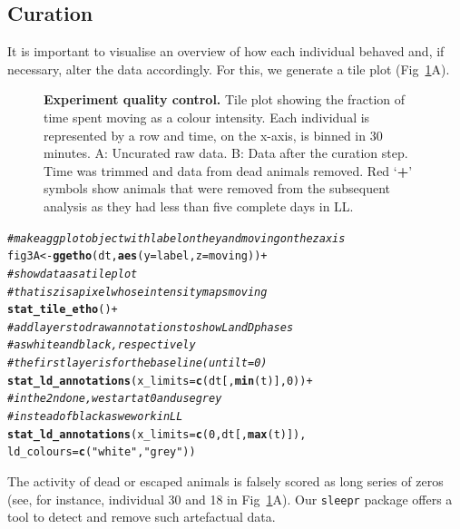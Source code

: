 \documentclass[10pt,letterpaper]{article}\usepackage[]{graphicx}\usepackage[]{color}
\makeatletter
\newcommand{\hlnum}[1]{\textcolor[rgb]{0.686,0.059,0.569}{#1}}%
\newcommand{\hlstr}[1]{\textcolor[rgb]{0.192,0.494,0.8}{#1}}%
\newcommand{\hlcom}[1]{\textcolor[rgb]{0.678,0.584,0.686}{\textit{#1}}}%
\newcommand{\hlopt}[1]{\textcolor[rgb]{0,0,0}{#1}}%
\newcommand{\hlstd}[1]{\textcolor[rgb]{0.345,0.345,0.345}{#1}}%
\newcommand{\hlkwb}[1]{\textcolor[rgb]{0.69,0.353,0.396}{#1}}%
\newcommand{\hlkwc}[1]{\textcolor[rgb]{0.333,0.667,0.333}{#1}}%
\newcommand{\hlkwd}[1]{\textcolor[rgb]{0.737,0.353,0.396}{\textbf{#1}}}%
\newenvironment{kframe}{%
 \def\at@end@of@kframe{}%
 \ifinner\ifhmode%
  \def\at@end@of@kframe{\end{minipage}}%
  \begin{minipage}{\columnwidth}%
 \fi\fi%
 \def\FrameCommand##1{\hskip\@totalleftmargin \hskip-\fboxsep
 \colorbox{shadecolor}{##1}\hskip-\fboxsep
     \hskip-\linewidth \hskip-\@totalleftmargin \hskip\columnwidth}%
 \MakeFramed {\advance\hsize-\width
   \@totalleftmargin\z@ \linewidth\hsize
   \@setminipage}}%
 {\par\unskip\endMakeFramed%
 \at@end@of@kframe}
\newenvironment{knitrout}{}{} %
\makeatother
\begin{document}
\subsection*{Curation}
It is important to visualise an overview of how each individual behaved and, if necessary, alter the data accordingly. For this, we generate a tile plot (Fig~\ref{fig:fig-3}A).

\begin{figure}[!h]
	\caption{{\bf Experiment quality control.}
			Tile plot showing the fraction of time spent moving as a colour intensity.
			Each individual is represented by a row and time, on the x-axis, is binned in 30 minutes.
			A: Uncurated raw data.
			B: Data after the curation step. Time was trimmed and data from dead animals removed. 
			Red `\textbf{+}' symbols show animals that were removed from the subsequent analysis as they had less than five complete days in LL.}
	\label{fig:fig-3}
\end{figure}

\begin{knitrout}
\color{fgcolor}\begin{kframe}
\begin{alltt}
\hlcom{# make a ggplot object with label on the y and moving on the z axis}
\hlstd{fig3A} \hlkwb{<-} \hlkwd{ggetho}\hlstd{(dt,} \hlkwd{aes}\hlstd{(}\hlkwc{y} \hlstd{= label,} \hlkwc{z} \hlstd{= moving))} \hlopt{+}
  \hlcom{# show data as a tile plot}
  \hlcom{# that is z is a pixel whose intensity maps moving}
  \hlkwd{stat_tile_etho}\hlstd{()} \hlopt{+}
  \hlcom{# add layers to draw annotations to show L and D phases}
  \hlcom{# as white and black, respectively}
  \hlcom{# the first layer is for the baseline (until t = 0)}
  \hlkwd{stat_ld_annotations}\hlstd{(}\hlkwc{x_limits} \hlstd{=} \hlkwd{c}\hlstd{(dt[,}\hlkwd{min}\hlstd{(t)],} \hlnum{0}\hlstd{))} \hlopt{+}
  \hlcom{# in the 2nd one, we start at 0 and use grey }
  \hlcom{# instead of black as we work in LL}
  \hlkwd{stat_ld_annotations}\hlstd{(}\hlkwc{x_limits} \hlstd{=} \hlkwd{c}\hlstd{(}\hlnum{0}\hlstd{, dt[,} \hlkwd{max}\hlstd{(t)]),}
                      \hlkwc{ld_colours} \hlstd{=} \hlkwd{c}\hlstd{(}\hlstr{"white"}\hlstd{,} \hlstr{"grey"}\hlstd{))}
\end{alltt}
\end{kframe}
\end{knitrout}


The activity of dead or escaped animals is falsely scored as long series of zeros (see, for instance, individual 30 and 18 in Fig~\ref{fig:fig-3}A).
Our \texttt{sleepr} package offers a tool to detect and remove such artefactual data.
\end{document}

